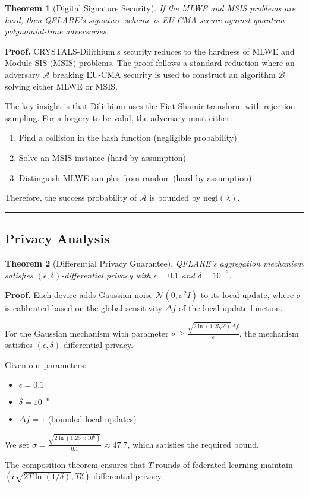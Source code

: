 \documentclass[journal,onecolumn]{IEEEtran}
\newtheorem{theorem}{Theorem}
\newenvironment{proof}[1][Proof]{\noindent\textbf{#1.} }{\ \rule{0.5em}{0.5em}}
\begin{document}
\begin{theorem}[Digital Signature Security]
If the MLWE and MSIS problems are hard, then QFLARE's signature scheme is EU-CMA secure against quantum polynomial-time adversaries.
\end{theorem}

\begin{proof}
CRYSTALS-Dilithium's security reduces to the hardness of MLWE and Module-SIS (MSIS) problems. The proof follows a standard reduction where an adversary $\mathcal{A}$ breaking EU-CMA security is used to construct an algorithm $\mathcal{B}$ solving either MLWE or MSIS.

The key insight is that Dilithium uses the Fiat-Shamir transform with rejection sampling. For a forgery to be valid, the adversary must either:
\begin{enumerate}
\item Find a collision in the hash function (negligible probability)
\item Solve an MSIS instance (hard by assumption)
\item Distinguish MLWE samples from random (hard by assumption)
\end{enumerate}

Therefore, the success probability of $\mathcal{A}$ is bounded by $\text{negl}(\lambda)$.
\end{proof}

\subsection{Privacy Analysis}

\begin{theorem}[Differential Privacy Guarantee]
QFLARE's aggregation mechanism satisfies $(\epsilon, \delta)$-differential privacy with $\epsilon = 0.1$ and $\delta = 10^{-6}$.
\end{theorem}

\begin{proof}
Each device adds Gaussian noise $\mathcal{N}(0, \sigma^2 I)$ to its local update, where $\sigma$ is calibrated based on the global sensitivity $\Delta f$ of the local update function.

For the Gaussian mechanism with parameter $\sigma \geq \frac{\sqrt{2\ln(1.25/\delta)}\Delta f}{\epsilon}$, the mechanism satisfies $(\epsilon, \delta)$-differential privacy.

Given our parameters:
\begin{itemize}
\item $\epsilon = 0.1$
\item $\delta = 10^{-6}$  
\item $\Delta f = 1$ (bounded local updates)
\end{itemize}

We set $\sigma = \frac{\sqrt{2\ln(1.25 \times 10^6)}}{0.1} \approx 47.7$, which satisfies the required bound.

The composition theorem ensures that $T$ rounds of federated learning maintain $(\epsilon \sqrt{2T\ln(1/\delta)}, T\delta)$-differential privacy.
\end{proof}
\end{document}
